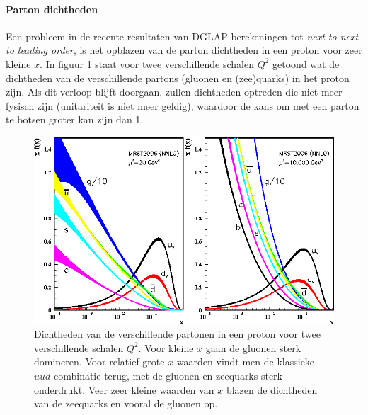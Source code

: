 \documentclass[a4paper,11pt]{article}
\numberwithin{equation}{section} %
\begin{document}
      \paragraph{Parton dichtheden}
Een probleem in de recente resultaten van DGLAP berekeningen tot \textit{next-to next-to leading order}, is het opblazen van de parton dichtheden in een proton voor zeer kleine $x$.
In figuur \ref{fig:PD} staat voor twee verschillende schalen $Q^2$ getoond wat de dichtheden van de verschillende partons (gluonen en (zee)quarks) in het proton zijn.
Als dit verloop blijft doorgaan, zullen dichtheden optreden die niet meer fysisch zijn (unitariteit is niet meer geldig), waardoor de kans om met een parton te botsen groter kan zijn dan 1.
\begin{figure} [H]
  \begin{center}
    \includegraphics[scale=1]{Afbeeldingen/PD.eps}
    \caption{Dichtheden van de verschillende partonen in een proton voor twee verschillende schalen $Q^2$. Voor kleine $x$ gaan de gluonen sterk domineren. Voor relatief grote $x$-waarden vindt men de klassieke $uud$ combinatie terug, met de gluonen en zeequarks sterk onderdrukt. Veer zeer kleine waarden van $x$ blazen de dichtheden van de zeequarks en vooral de gluonen op.\cite{Martin}}
   \label{fig:PD}
  \end{center}
\end{figure}
\end{document}
